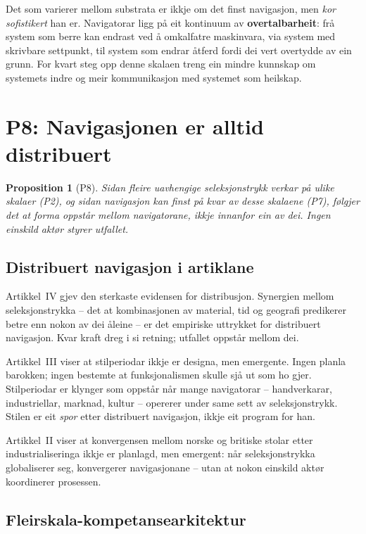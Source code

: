 \documentclass[12pt,a4paper,oneside]{report}
\newtheorem{proposition}[theorem]{Proposition}
\begin{document}
Det som varierer mellom substrata er ikkje om det finst navigasjon, men \emph{kor sofistikert} han er. Navigatorar ligg på eit kontinuum av \textbf{overtalbarheit}: frå system som berre kan endrast ved å omkalfatre maskinvara, via system med skrivbare settpunkt, til system som endrar åtferd fordi dei vert overtydde av ein grunn. For kvart steg opp denne skalaen treng ein mindre kunnskap om systemets indre og meir kommunikasjon med systemet som heilskap.

\section{P8: Navigasjonen er alltid distribuert}
\label{sec:p8}

\begin{proposition}[P8]
Sidan fleire uavhengige seleksjonstrykk verkar på ulike skalaer (P2), og sidan navigasjon kan finst på kvar av desse skalaene (P7), følgjer det at forma oppstår mellom navigatorane, ikkje innanfor ein av dei. Ingen einskild aktør styrer utfallet.
\end{proposition}

\subsection{Distribuert navigasjon i artiklane}

Artikkel~IV gjev den sterkaste evidensen for distribusjon. Synergien mellom seleksjonstrykka -- det at kombinasjonen av material, tid og geografi predikerer betre enn nokon av dei åleine -- er det empiriske uttrykket for distribuert navigasjon. Kvar kraft dreg i si retning; utfallet oppstår mellom dei.

Artikkel~III viser at stilperiodar ikkje er designa, men emergente. Ingen planla barokken; ingen bestemte at funksjonalismen skulle sjå ut som ho gjer. Stilperiodar er klynger som oppstår når mange navigatorar -- handverkarar, industriellar, marknad, kultur -- opererer under same sett av seleksjonstrykk. Stilen er eit \emph{spor} etter distribuert navigasjon, ikkje eit program for han.

Artikkel~II viser at konvergensen mellom norske og britiske stolar etter industrialiseringa ikkje er planlagd, men emergent: når seleksjonstrykka globaliserer seg, konvergerer navigasjonane -- utan at nokon einskild aktør koordinerer prosessen.

\subsection{Fleirskala-kompetansearkitektur}
\end{document}
